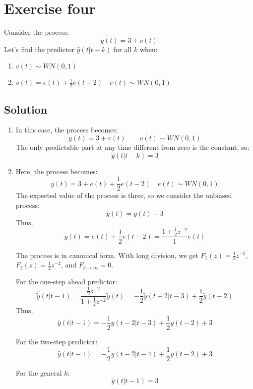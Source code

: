 \section{Exercise four}

Consider the process: 
\[y(t)=3+v(t)\]
Let's find the predictor $\hat{y}(t|t-k)$ for all $k$ when: 
\begin{enumerate}
    \item $v(t)\sim WN(0,1)$
    \item $v(t)=e(t)+\frac{1}{2}e(t-2)\quad e(t)\sim WN(0,1)$
\end{enumerate}

\subsection*{Solution}
\begin{enumerate}
    \item In this case, the process becomes:
        \[y(t)=3+v(t) \qquad v(t)\sim WN(0,1)\]
        The only predictable part at any time different from zero is the constant, so:
        \[\hat{y}(t|t-k)=3\]
    \item Here, the process becomes:
        \[y(t)=3+e(t)+\frac{1}{2}e(t-2)\quad e(t)\sim WN(0,1)\]
        The expected value of the process is three, so we consider the unbiased process:
        \[\tilde{y}(t)=y(t)-3\]
        Thus,
        \[\tilde{y}(t)=e(t)+\frac{1}{2}e(t-2)=\dfrac{1+\frac{1}{2}z^{-2}}{1}e(t)\]

        The process is in canonical form. 
        With long division, we get $F_1(z)=\frac{1}{2}z^{-2}$, $F_2(z)=\frac{1}{2}z^{-2}$, and $F_{3\rightarrow\infty}=0$. 

        For the one-step ahead predictor: 
        \[\hat{\tilde{y}}(t|t-1)=\dfrac{\frac{1}{2}z^{-2}}{1+\frac{1}{2}z^{-2}}\tilde{y}(t)=-\dfrac{1}{2}\tilde{y}(t-2|t-3)+\dfrac{1}{2}\tilde{y}(t-2)\]
        Thus, 
        \[\hat{y}(t|t-1)=-\dfrac{1}{2}y(t-2|t-3)+\dfrac{1}{2}y(t-2)+3\]

        For the two-step predictor: 
        \[\hat{y}(t|t-1)=-\dfrac{1}{2}y(t-2|t-4)+\dfrac{1}{2}y(t-2)+3\]

        For the general $k$: 
        \[\hat{y}(t|t-1)=3\]
\end{enumerate}